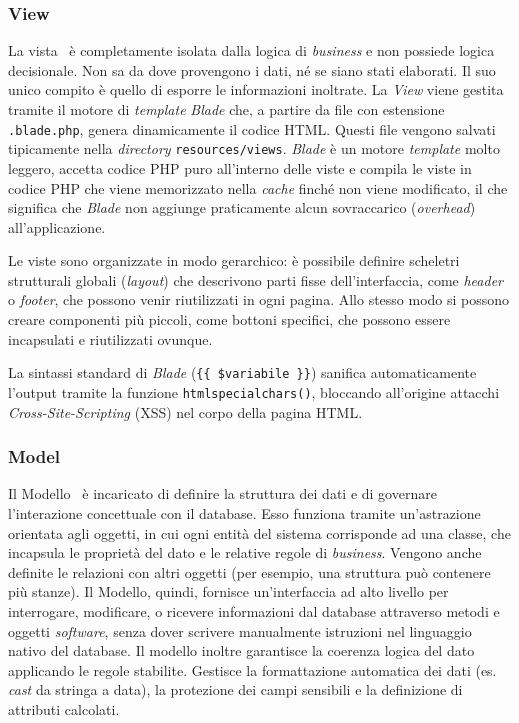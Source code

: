 \subsubsection*{View}
La vista~\autocite{Views} è completamente isolata dalla logica di \textit{business} e non possiede logica decisionale. Non sa da dove provengono i dati, né se siano stati elaborati. Il suo unico compito è quello di esporre le informazioni inoltrate.
La \textit{View} viene gestita tramite il motore di \textit{template} \textit{Blade} che, a partire da file con estensione \texttt{.blade.php}, genera dinamicamente il codice HTML. Questi file vengono salvati tipicamente nella \textit{directory} \texttt{resources/views}. \textit{Blade} è un motore \textit{template} molto leggero, accetta codice PHP puro all’interno delle viste e compila le viste in codice PHP che viene memorizzato nella \textit{cache} finché non viene modificato, il che significa che \textit{Blade} non aggiunge praticamente alcun sovraccarico (\textit{overhead}) all’applicazione.

Le viste sono organizzate in modo gerarchico: è possibile definire scheletri strutturali globali (\textit{layout}) che descrivono parti fisse dell’interfaccia, come \textit{header} o \textit{footer}, che possono venir riutilizzati in ogni pagina. Allo stesso modo si possono creare componenti più piccoli, come bottoni specifici, che possono essere incapsulati e riutilizzati ovunque.

La sintassi standard di \textit{Blade} (\texttt{\{\{ \$variabile \}\}}) sanifica automaticamente l'output tramite la funzione \texttt{htmlspecialchars()}, bloccando all’origine attacchi \textit{Cross-Site-Scripting} (XSS) nel corpo della pagina HTML. 

\subsubsection*{Model}
Il Modello~\autocite{Eloquent} è incaricato di definire la struttura dei dati e di governare l’interazione concettuale con il database. Esso funziona tramite un’astrazione orientata agli oggetti, in cui ogni entità del sistema corrisponde ad una classe, che incapsula le proprietà del dato e le relative regole di \textit{business}. Vengono anche definite le relazioni con altri oggetti (per esempio, una struttura può contenere più stanze). 
Il Modello, quindi, fornisce un’interfaccia ad alto livello per interrogare, modificare, o ricevere informazioni dal database attraverso metodi e oggetti \textit{software}, senza dover scrivere manualmente istruzioni nel linguaggio nativo del database.  
Il modello inoltre garantisce la coerenza logica del dato applicando le regole stabilite. Gestisce la formattazione automatica dei dati (es. \textit{cast} da stringa a data), la protezione dei campi sensibili e la definizione di attributi calcolati. 

